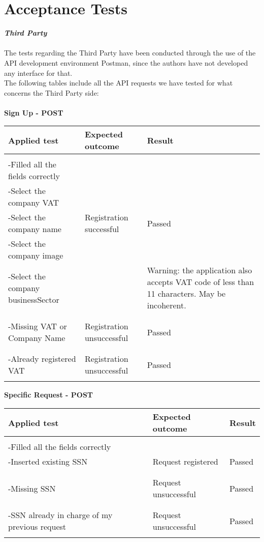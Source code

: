 \section{Acceptance Tests}
\textbf{\textit{Third Party}}\\\\
The tests regarding the Third Party have been conducted through the use of the API development environment Postman, since the authors have not developed any interface for that.\\ The following tables include all the API requests we have tested for what concerns the Third Party side:\\\\
\textbf{Sign Up - POST}
\begin{center}
	\begin{tabular}{|p{}|p{}|p{}|}
		\hline
		Applied test & Expected outcome & Result \\
		\hline
		&&\\
		-Filled all the fields correctly&&\\
		-Select the company VAT&&\\
		-Select the company name&Registration successful&Passed \\
		-Select the company image&&\\
		-Select the company businessSector&&Warning: the application also accepts VAT code of less than 11 characters. May be incoherent.\\
		&&\\
		\hline
		&&\\
		-Missing VAT or Company Name&Registration unsuccessful&Passed\\
		&&\\
		\hline
		&&\\
		-Already registered VAT&Registration unsuccessful&Passed\\
		&&\\
		\hline
	\end{tabular}
\end{center}
\newpage
\textbf{Specific Request - POST}
\begin{center}
	\begin{tabular}{|p{}|p{}|p{}|}
		\hline
		Applied test & Expected outcome & Result \\
		\hline
		&&\\
		-Filled all the fields correctly&&\\
		-Inserted existing SSN&Request registered&Passed\\
		&&\\
		\hline
		&&\\
		-Missing SSN &Request unsuccessful&Passed\\
		&&\\
		\hline
		&&\\
		-SSN already in charge of my previous request&Request unsuccessful&Passed\\
		&&\\
		\hline
	\end{tabular}
\end{center}
